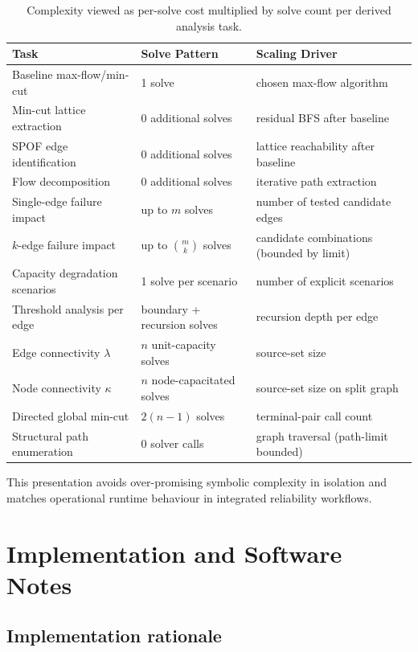 \documentclass[12pt]{report}
\begin{document}
\begin{table}[h!]
\centering
\begin{tabular}{@{}lll@{}}
\toprule
Task & Solve Pattern & Scaling Driver \\
\midrule
Baseline max-flow/min-cut & 1 solve & chosen max-flow algorithm \\
Min-cut lattice extraction & 0 additional solves & residual BFS after baseline \\
SPOF edge identification & 0 additional solves & lattice reachability after baseline \\
Flow decomposition & 0 additional solves & iterative path extraction \\
Single-edge failure impact & up to $m$ solves & number of tested candidate edges \\
$k$-edge failure impact & up to $\binom{m}{k}$ solves & candidate combinations (bounded by limit) \\
Capacity degradation scenarios & 1 solve per scenario & number of explicit scenarios \\
Threshold analysis per edge & boundary + recursion solves & recursion depth per edge \\
Edge connectivity $\lambda$ & $n$ unit-capacity solves & source-set size \\
Node connectivity $\kappa$ & $n$ node-capacitated solves & source-set size on split graph \\
Directed global min-cut & $2(n-1)$ solves & terminal-pair call count \\
Structural path enumeration & 0 solver calls & graph traversal (path-limit bounded) \\
\bottomrule
\end{tabular}
\caption{Complexity viewed as per-solve cost multiplied by solve count per derived analysis task.}
\end{table}

This presentation avoids over-promising symbolic complexity in isolation and matches operational runtime behaviour in integrated reliability workflows.

\section{Implementation and Software Notes}

\subsection{Implementation rationale}
\end{document}
